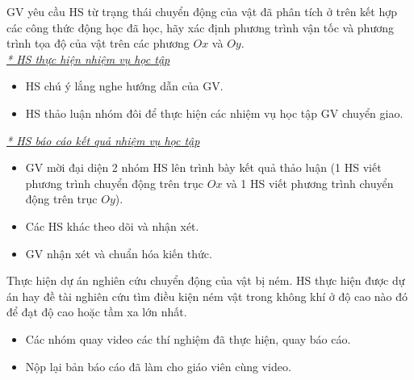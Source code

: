 {\begin{center}
	\end{center}
	\item GV yêu cầu HS từ trạng thái chuyển động của vật đã phân tích ở trên kết hợp các công thức động học đã học, hãy xác định phương trình vận tốc và phương trình tọa độ của vật trên các phương $Ox$ và $Oy$.\\
	\textit{\underline{* HS thực hiện nhiệm vụ học tập}}
	\begin{itemize}[label=-]
		\item HS chú ý lắng nghe hướng dẫn của GV.
		\item HS thảo luận nhóm đôi để thực hiện các nhiệm vụ học tập GV chuyển giao.
	\end{itemize}
	\textit{\underline{* HS báo cáo kết quả nhiệm vụ học tập}}
	\begin{itemize}[label=-]
		\item GV mời đại diện 2 nhóm HS lên trình bày kết quả thảo luận (1 HS viết phương trình chuyển động trên trục $Ox$ và 1 HS viết phương trình chuyển động trên trục $Oy$).
		\item Các HS khác theo dõi và nhận xét.
		\item GV nhận xét và chuẩn hóa kiến thức.
	\end{itemize}
}
\hoatdong
{Thực hiện dự án nghiên cứu chuyển động của vật bị ném.
}
{HS thực hiện được dự án hay đề tài nghiên cứu tìm điều kiện ném vật trong không khí ở độ cao nào đó để đạt độ cao hoặc tầm xa lớn nhất.
}
{\begin{itemize}
		\item Các nhóm quay video các thí nghiệm đã thực hiện, quay báo cáo.
		\item Nộp lại bản báo cáo đã làm cho giáo viên cùng video.
	\end{itemize}
}
